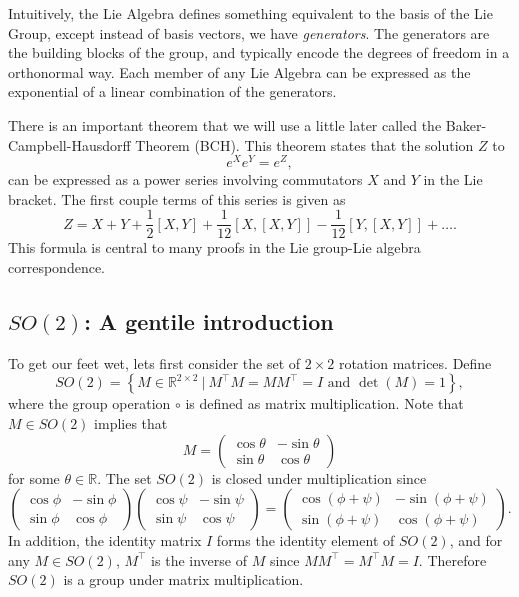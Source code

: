 Intuitively, the Lie Algebra defines something equivalent to the basis of the Lie Group, except instead of basis vectors, we have \emph{generators}.  The generators are the building blocks of the group, and typically encode the degrees of freedom in a orthonormal way. Each member of any Lie Algebra can be expressed as the exponential of a linear combination of the generators.

There is an important theorem that we will use a little later called the Baker-Campbell-Hausdorff Theorem (BCH). This theorem states that the solution $Z$ to
\[
	e^{X}e^{Y}=e^{Z},
\]
can be expressed as a power series involving commutators $X$ and $Y$ in the Lie bracket. The first couple terms of this series is given as
\[
	Z=X+Y+\frac{1}{2}\left[X,Y\right]+\frac{1}{12}\left[X,\left[X,Y\right]\right]-\frac{1}{12}\left[Y,\left[X,Y\right]\right]+\dots.
\]
This formula is central to many proofs in the Lie group-Lie algebra correspondence.

\subsection{$SO(2)$: A gentile introduction}
To get our feet wet, lets first consider the set of $2\times 2$ rotation matrices.
Define
\[
SO(2) = \left\{ M\in\mathbb{R}^{2\times 2} ~|~ M^\top M = MM^\top = I \text{~and~} \det(M)=1 \right\},
\]
where the group operation $\circ$ is defined as matrix multiplication.  
Note that $M\in SO(2)$ implies that
\[
M = \begin{pmatrix} \cos\theta & -\sin\theta \\ \sin\theta & \cos\theta \end{pmatrix}
\]
for some $\theta\in\mathbb{R}$.  The set $SO(2)$ is closed under multiplication since
\[
\begin{pmatrix} \cos\phi & -\sin\phi \\ \sin\phi & \cos\phi \end{pmatrix} \begin{pmatrix} \cos\psi & -\sin\psi \\ \sin\psi & \cos\psi \end{pmatrix} = 
\begin{pmatrix} \cos(\phi+\psi) & -\sin(\phi + \psi) \\ \sin(\phi+\psi) & \cos(\phi+\psi) \end{pmatrix}.
\]
In addition, the identity matrix $I$ forms the identity element of $SO(2)$, and for any $M\in SO(2)$, $M^\top$ is the inverse of $M$ since $MM^\top = M^\top M = I$.  Therefore $SO(2)$ is a group under matrix multiplication.

